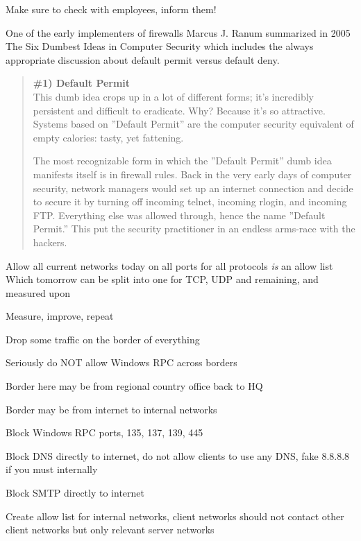 \documentclass[Screen16to9,17pt]{foils}
\begin{document}
Make sure to check with employees, inform them!




One of the early implementers of firewalls Marcus J. Ranum summarized in 2005 The Six Dumbest Ideas in Computer Security  which includes the always appropriate discussion about default permit versus default deny.

\begin{quote}\small {\bf
\#1) Default Permit}\\
This dumb idea crops up in a lot of different forms; it’s incredibly persistent and difficult to eradicate. Why? Because it’s so attractive. Systems based on ”Default Permit” are the computer security equivalent of empty calories: tasty, yet fattening.

The most recognizable form in which the ”Default Permit” dumb idea manifests itself is in firewall rules. Back in the very early days of computer security, network managers would set up an internet connection and decide to secure it by turning off incoming telnet, incoming rlogin, and incoming FTP. Everything else was allowed through, hence the name ”Default Permit.” This put the security practitioner in an endless arms-race with the hackers.
\end{quote}


\begin{list2}
\item Allow all current networks today on all ports for all protocols \emph{is} an allow list \\
Which tomorrow can be split into one for TCP, UDP and remaining, and measured upon
\item Measure, improve, repeat
\end{list2}




\begin{list2}
\item Drop some traffic on the border of everything
\item Seriously do NOT allow Windows RPC across borders
\item Border here may be from regional country office back to HQ
\item Border may be from internet to internal networks
\item Block Windows RPC ports, 135, 137, 139, 445
\item Block DNS directly to internet, do not allow clients to use any DNS, fake 8.8.8.8 if you must internally
\item Block SMTP directly to internet
\item Create allow list for internal networks, client networks should not contact other client networks but only relevant server networks
\end{list2}
\end{document}
